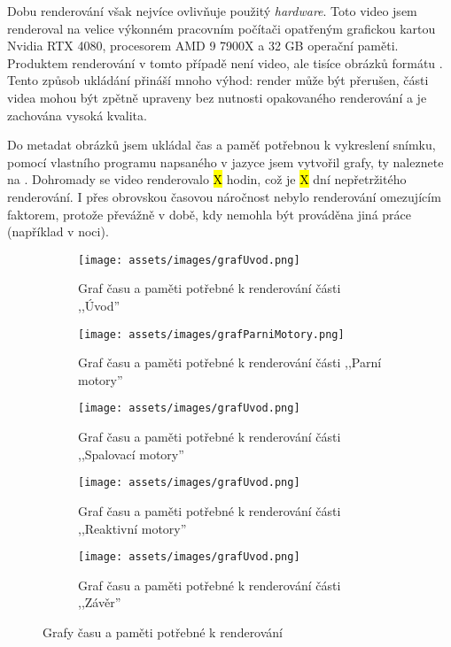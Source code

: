 {Dobu renderování však nejvíce ovlivňuje použitý \textit{hardware}. Toto video jsem renderoval na velice výkonném pracovním počítači opatřeným grafickou kartou Nvidia RTX 4080, procesorem AMD 9 7900X a 32 GB operační paměti.}\odst
{Produktem renderování v tomto případě není video, ale tisíce obrázků formátu . Tento způsob ukládání přináší mnoho výhod: render může být přerušen, části videa mohou být zpětně upraveny bez nutnosti opakovaného renderování a je zachována vysoká kvalita.}

\newpage

{Do metadat obrázků jsem ukládal čas a paměť potřebnou k vykreslení snímku, pomocí vlastního programu napsaného v jazyce  jsem vytvořil grafy, ty naleznete na . Dohromady se video renderovalo \hl{X} hodin, což je \hl{X} dní nepřetržitého renderování. I přes obrovskou časovou náročnost nebylo renderování omezujícím faktorem, protože převážně v době, kdy nemohla být prováděna jiná práce (například v noci).}

\begin{figure}[H]
    \centering
    \begin{subfigure}{\textwidth}
        \centering
        \texttt{[image: assets/images/grafUvod.png]}
        \caption{Graf času a paměti potřebné k renderování části ,,Úvod'' \jaGraf}\vspace{0.25cm}
    \end{subfigure}
    \begin{subfigure}{\textwidth}
        \texttt{[image: assets/images/grafParniMotory.png]}
        \caption{Graf času a paměti potřebné k renderování části ,,Parní motory'' \jaGraf}\vspace{0.25cm}
    \end{subfigure}
    \begin{subfigure}{\textwidth}
        \texttt{[image: assets/images/grafUvod.png]}
        \caption{Graf času a paměti potřebné k renderování části ,,Spalovací motory'' \jaGraf}\vspace{0.25cm}
    \end{subfigure}
    \begin{subfigure}{\textwidth}
        \texttt{[image: assets/images/grafUvod.png]}
        \caption{Graf času a paměti potřebné k renderování části ,,Reaktivní motory'' \jaGraf}\vspace{0.25cm}
    \end{subfigure}
    \begin{subfigure}{\textwidth}
        \texttt{[image: assets/images/grafUvod.png]}
        \caption{Graf času a paměti potřebné k renderování části ,,Závěr'' \jaGraf}
    \end{subfigure}
    \caption{Grafy času a paměti potřebné k renderování}
    \label{obr:grafRender}
\end{figure}

